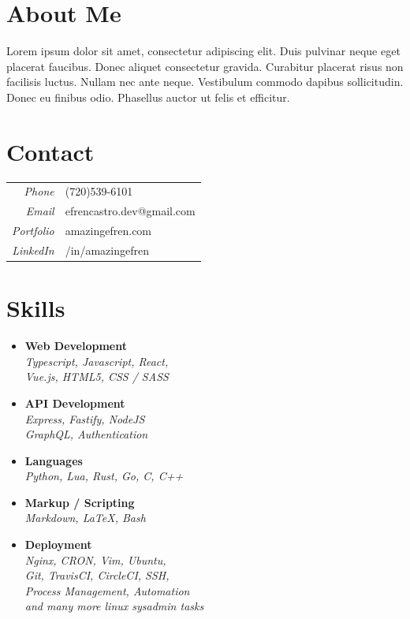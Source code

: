 \documentclass[11pt,oneside,a4paper,titlepage]{article}
\begin{document}
\begin{tcolorbox}
  \begin{minipage}[t]{9cm}
    \vspace*{-0.5cm}
    \begin{tcolorbox}[grow to left by=0.55cm,colback=themeBorder,colframe=white,arc=0mm,]
      \section*{About Me}
        Lorem ipsum dolor sit amet, consectetur adipiscing elit. Duis pulvinar neque eget placerat faucibus. Donec aliquet consectetur gravida. Curabitur placerat risus non facilisis luctus. Nullam nec ante neque. Vestibulum commodo dapibus sollicitudin. Donec eu finibus odio. Phasellus auctor ut felis et efficitur.
      \section*{Contact}
      \begin{tabular}{r l}
        \emph{Phone}      & (720)539-6101 \\
        \emph{Email}      & efrencastro.dev@gmail.com \\
        \emph{Portfolio}  & amazingefren.com \\
        \emph{LinkedIn}   & /in/amazingefren
      \end{tabular}

      \section*{Skills}

      \begin{itemize}[leftmargin=0.8cm]
        \item{
          \textbf{Web Development} \\ 
          \emph{Typescript, Javascript, React,} \\
          \emph{Vue.js, HTML5, CSS / SASS}
        }
        \item{
            \textbf{API Development} \\
            \emph{Express, Fastify, NodeJS} \\
            \emph{GraphQL, Authentication}
          }
        \item{
            \textbf{Languages} \\
            \emph{Python, Lua, Rust, Go, C, C++}
          }
        \item{
            \textbf{Markup / Scripting} \\
            \emph{Markdown, LaTeX, Bash}
          }
        \item{
            \textbf{Deployment} \\
            \emph{Nginx, CRON, Vim, Ubuntu,} \\
            \emph{Git, TravisCI, CircleCI, SSH,} \\
            \emph{Process Management, Automation} \\
            \emph{and many more linux sysadmin tasks}
          }
      \end{itemize}


\end{tcolorbox}
\end{minipage}
\end{tcolorbox}
\end{document}
